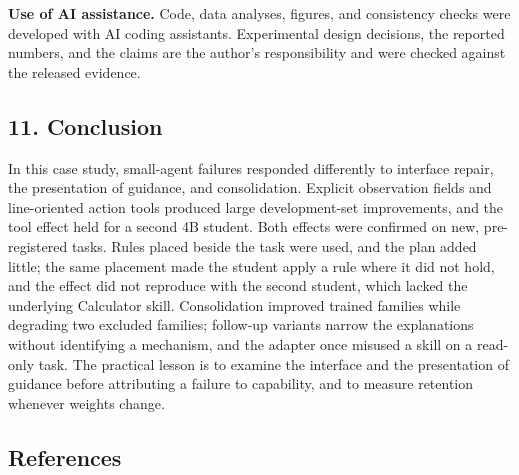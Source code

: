 \documentclass[
  10pt,
]{article}
\begin{document}
\textbf{Use of AI assistance.} Code, data analyses, figures, and
consistency checks were developed with AI coding assistants.
Experimental design decisions, the reported numbers, and the claims are
the author's responsibility and were checked against the released
evidence.

\subsection{11. Conclusion}\label{conclusion}

In this case study, small-agent failures responded differently to
interface repair, the presentation of guidance, and consolidation.
Explicit observation fields and line-oriented action tools produced
large development-set improvements, and the tool effect held for a
second 4B student. Both effects were confirmed on new, pre-registered
tasks. Rules placed beside the task were used, and the plan added
little; the same placement made the student apply a rule where it did
not hold, and the effect did not reproduce with the second student,
which lacked the underlying Calculator skill. Consolidation improved
trained families while degrading two excluded families; follow-up
variants narrow the explanations without identifying a mechanism, and
the adapter once misused a skill on a read-only task. The practical
lesson is to examine the interface and the presentation of guidance
before attributing a failure to capability, and to measure retention
whenever weights change.

\small

\subsection{References}\label{references}
\end{document}
